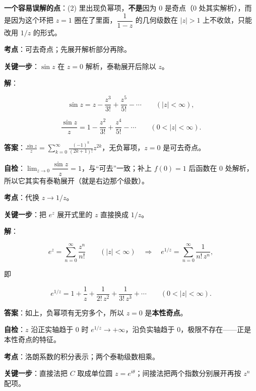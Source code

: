 \documentclass[11pt]{ctexart}
\renewcommand{\qbreak}{\needspace{0.45\textheight}}
\begin{document}
\textbf{一个容易误解的点}：(2) 里出现负幂项，\textbf{不是}因为 $0$ 是奇点（$0$ 处其实解析），而是因为这个环把 $z=1$ 圈在了里面，$\dfrac{1}{1-z}$ 的几何级数在 $|z|>1$ 上不收敛，只能改用 $1/z$ 的形式。

\qbreak
{}

\textbf{考点}：可去奇点；先展开解析部分再除。

\textbf{关键一步}：$\sin z$ 在 $z=0$ 解析，泰勒展开后除以 $z$。

\textbf{解}：

\[ \sin z=z-\frac{z^3}{3!}+\frac{z^5}{5!}-\cdots\qquad(|z|<\infty) , \]

\[ \frac{\sin z}{z}=1-\frac{z^2}{3!}+\frac{z^4}{5!}-\cdots\qquad(0<|z|<\infty) . \]

\textbf{答案}：$\displaystyle\frac{\sin z}{z}=\sum_{k=0}^{\infty}\frac{(-1)^k}{(2k+1)!}z^{2k}$，无负幂项，$z=0$ 是可去奇点。

\textbf{自检}：$\lim_{z\to0}\dfrac{\sin z}{z}=1$，与“可去”一致；补上 $f(0)=1$ 后函数在 $0$ 处解析，所以它其实有泰勒展开（就是右边那个级数）。

\qbreak
{}

\textbf{考点}：代换 $z\to1/z$。

\textbf{关键一步}：把 $e^z$ 展开式里的 $z$ 直接换成 $1/z$。

\textbf{解}：

\[ e^z=\sum_{n=0}^{\infty}\frac{z^n}{n!}\qquad(|z|<\infty)\quad\Longrightarrow\quad e^{1/z}=\sum_{n=0}^{\infty}\frac{1}{n!\,z^n} , \]

即

\[ e^{1/z}=1+\frac1z+\frac{1}{2!\,z^2}+\frac{1}{3!\,z^3}+\cdots\qquad(0<|z|<\infty) . \]

\textbf{答案}：如上，负幂项有无穷多个，所以 $z=0$ 是\textbf{本性奇点}。

\textbf{自检}：$z$ 沿正实轴趋于 $0$ 时 $e^{1/z}\to+\infty$，沿负实轴趋于 $0$，极限不存在——正是本性奇点的特征。

\qbreak
{}

\textbf{考点}：洛朗系数的积分表示；两个泰勒级数相乘。

\textbf{关键一步}：直接法把 $C$ 取成单位圆 $z=e^{i\theta}$；间接法把两个指数分别展开再按 $z^n$ 配项。
\end{document}
